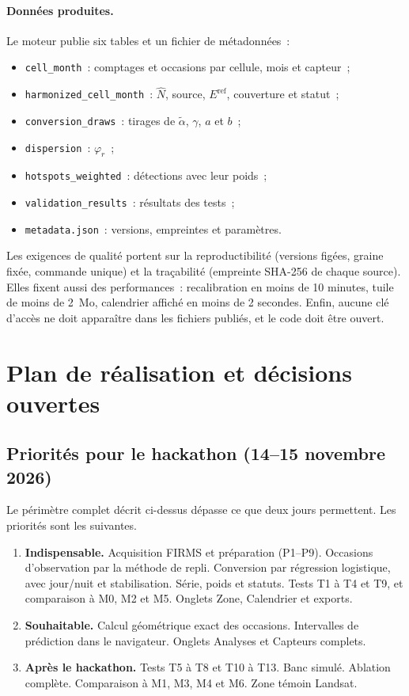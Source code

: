 \documentclass[11pt,a4paper]{article}
\begin{document}
\paragraph{Données produites.} Le moteur publie six tables et un fichier de métadonnées~:
\begin{itemize}
  \item \texttt{cell\_month}~: comptages et occasions par cellule, mois et capteur~;
  \item \texttt{harmonized\_cell\_month}~: $\hat N$, source, $E^{\text{ref}}$, couverture et statut~;
  \item \texttt{conversion\_draws}~: tirages de $\tilde\alpha$, $\gamma$, $a$ et $b$~;
  \item \texttt{dispersion}~: $\varphi_r$~;
  \item \texttt{hotspots\_weighted}~: détections avec leur poids~;
  \item \texttt{validation\_results}~: résultats des tests~;
  \item \texttt{metadata.json}~: versions, empreintes et paramètres.
\end{itemize}
Les exigences de qualité portent sur la reproductibilité (versions figées, graine fixée, commande unique) et la traçabilité (empreinte SHA-256 de chaque source). Elles fixent aussi des performances~: recalibration en moins de 10 minutes, tuile de moins de 2~Mo, calendrier affiché en moins de 2 secondes. Enfin, aucune clé d'accès ne doit apparaître dans les fichiers publiés, et le code doit être ouvert.

\section{Plan de réalisation et décisions ouvertes}\label{sec:plan}

\subsection{Priorités pour le hackathon (14--15 novembre 2026)}

Le périmètre complet décrit ci-dessus dépasse ce que deux jours permettent. Les priorités sont les suivantes.
\begin{enumerate}
  \item \textbf{Indispensable.} Acquisition FIRMS et préparation (P1--P9). Occasions d'observation par la méthode de repli. Conversion par régression logistique, avec jour/nuit et stabilisation. Série, poids et statuts. Tests T1 à T4 et T9, et comparaison à M0, M2 et M5. Onglets Zone, Calendrier et exports.
  \item \textbf{Souhaitable.} Calcul géométrique exact des occasions. Intervalles de prédiction dans le navigateur. Onglets Analyses et Capteurs complets.
  \item \textbf{Après le hackathon.} Tests T5 à T8 et T10 à T13. Banc simulé. Ablation complète. Comparaison à M1, M3, M4 et M6. Zone témoin Landsat.
\end{enumerate}
\end{document}

